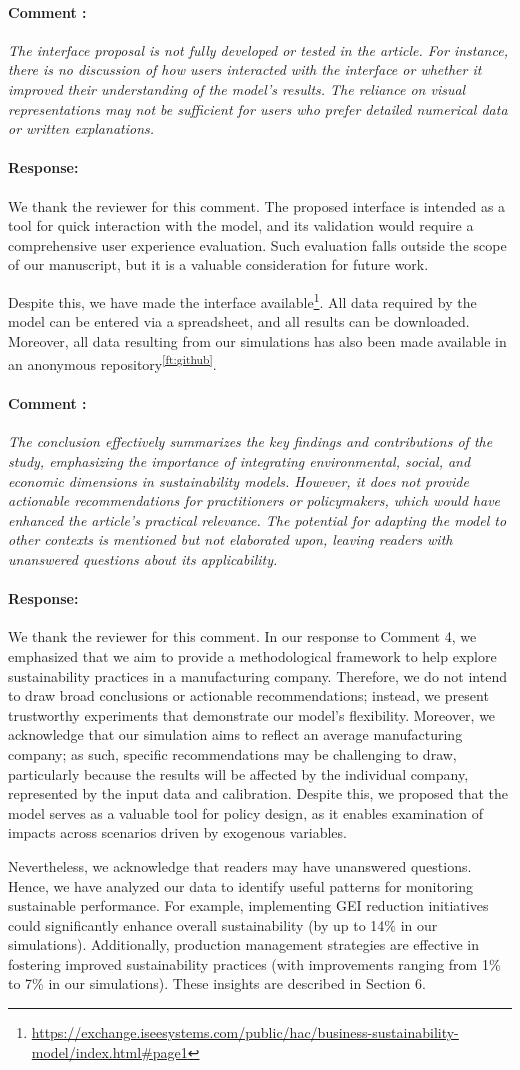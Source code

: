 \documentclass[11pt]{article}
\newcommand{\ReviewerComment}[1]{\paragraph*{Comment \stepcounter{NumComment}\arabic{NumComment}:} \textit{#1}}
\newcommand{\AuthorResponse}{\paragraph*{Response:}}
\begin{document}
    \ReviewerComment{The interface proposal is not fully developed or tested in the article. For instance, there is no discussion of how users interacted with the interface or whether it improved their understanding of the model's results. The reliance on visual representations may not be sufficient for users who prefer detailed numerical data or written explanations.}

    \AuthorResponse{We thank the reviewer for this comment. The proposed interface is intended as a tool for quick interaction with the model, and its validation would require a comprehensive user experience evaluation. Such evaluation falls outside the scope of our manuscript, but it is a valuable consideration for future work.

    Despite this, we have made the interface available\footnote{\label{ft:interface}\url{https://exchange.iseesystems.com/public/hac/business-sustainability-model/index.html#page1}}. All data required by the model can be entered via a spreadsheet, and all results can be downloaded. Moreover, all data resulting from our simulations has also been made available in an anonymous repository\textsuperscript{\ref{ft:github}}.}

    \ReviewerComment{The conclusion effectively summarizes the key findings and contributions of the study, emphasizing the importance of integrating environmental, social, and economic dimensions in sustainability models. However, it does not provide actionable recommendations for practitioners or policymakers, which would have enhanced the article's practical relevance. The potential for adapting the model to other contexts is mentioned but not elaborated upon, leaving readers with unanswered questions about its applicability.}

    \AuthorResponse{We thank the reviewer for this comment. In our response to Comment 4, we emphasized that we aim to provide a methodological framework to help explore sustainability practices in a manufacturing company. Therefore, we do not intend to draw broad conclusions or actionable recommendations; instead, we present trustworthy experiments that demonstrate our model's flexibility. Moreover, we acknowledge that our simulation aims to reflect an average manufacturing company; as such, specific recommendations may be challenging to draw, particularly because the results will be affected by the individual company, represented by the input data and calibration. Despite this, we proposed that the model serves as a valuable tool for policy design, as it enables examination of impacts across scenarios driven by exogenous variables.

    Nevertheless, we acknowledge that readers may have unanswered questions. Hence, we have analyzed our data to identify useful patterns for monitoring sustainable performance. For example, implementing GEI reduction initiatives could significantly enhance overall sustainability (by up to 14\% in our simulations). Additionally, production management strategies are effective in fostering improved sustainability practices (with improvements ranging from 1\% to 7\% in our simulations). These insights are described in Section 6.}
\end{document}
